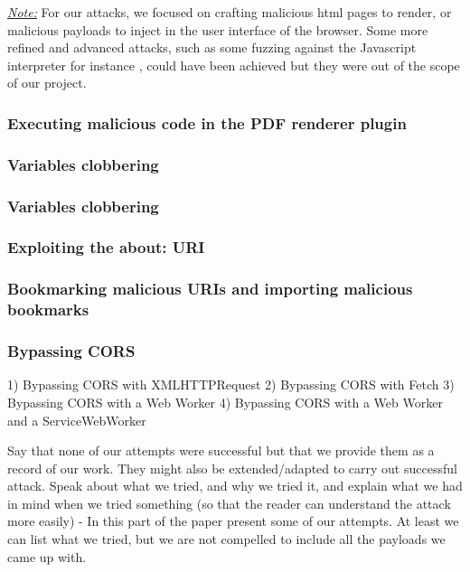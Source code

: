 \documentclass[journal]{IEEEtran}
\begin{document}
\medskip

\underline{\emph{Note:}} For our attacks, we focused on crafting malicious html pages to render, or malicious payloads to inject in the user interface of the browser. Some more refined and advanced attacks, such as some fuzzing  against the Javascript interpreter for instance \cite{microsoftFuzzingOnv8}, could have been achieved but they were out of the scope of our project.


\subsubsection*{Executing malicious code in the PDF renderer plugin}

\subsubsection*{Variables clobbering}

\subsubsection*{Variables clobbering}

\subsubsection*{Exploiting the about: URI}

\subsubsection*{Bookmarking malicious URIs and importing malicious bookmarks}

\subsubsection*{Bypassing CORS}
1) Bypassing CORS with XMLHTTPRequest
2) Bypassing CORS with Fetch
3) Bypassing CORS with a Web Worker
4) Bypassing CORS with a Web Worker and a ServiceWebWorker



Say that none of our attempts were successful but that we provide them as a record of our work. They might also be extended/adapted to carry out successful attack.
Speak about what we tried, and why we tried it, and explain what we had in mind when we tried something (so that the reader can understand the attack more easily)
- In this part of the paper present some of our attempts. At least we can list what we tried, but we are not compelled to include all the payloads we came up with.
\end{document}

